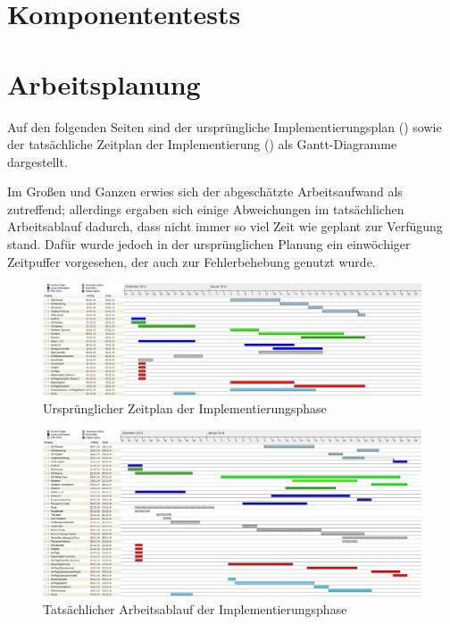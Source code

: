 \documentclass[a4paper, 11pt]{article}
\begin{document}
\section{Komponententests}

\section{Arbeitsplanung}
Auf den folgenden Seiten sind der ursprüngliche Implementierungsplan () sowie der tatsächliche Zeitplan der Implementierung () als Gantt-Diagramme dargestellt.

Im Großen und Ganzen erwies sich der abgeschätzte Arbeitsaufwand als zutreffend; allerdings ergaben sich einige Abweichungen im tatsächlichen Arbeitsablauf dadurch, dass nicht immer so viel Zeit wie geplant zur Verfügung stand. Dafür wurde jedoch in der ursprünglichen Planung ein einwöchiger Zeitpuffer vorgesehen, der auch zur Fehlerbehebung genutzt wurde.

\begin{figure}[h]
\centering
\vspace{-2.5cm}\includegraphics[angle=90,scale=0.4]{zeitplan}
\caption{Ursprünglicher Zeitplan der Implementierungsphase}
\label{fig:zeitplan}
\end{figure}
\begin{figure}[h]
\centering
\vspace{-2.25cm}\includegraphics[angle=90,scale=0.4]{zeitplan_final}
\caption{Tatsächlicher Arbeitsablauf der Implementierungsphase}
\label{fig:zeitplan_final}
\end{figure}

\makeatletter
{}
\makeatother
\printglossary[type=main, title={Glossar}, toctitle={Glossar}, style=myAltlist]
\end{document}
